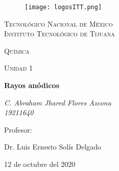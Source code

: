 \documentclass[letterpaper, 12pt]{article}
\begin{document}
\begin{titlepage}
    \begin{figure}[ht]
        \centering
        \texttt{[image: logosITT.png]}
    \end{figure}
    \centering
    {\scshape\LARGE Tecnológico Nacional de México\\Instituto Tecnológico de Tijuana\par}
    \vspace{1cm}
    {\scshape\Large Química\par}
    \vspace{1cm}
    {\scshape\Large Unidad 1\par}
    \vspace{1.5cm}
    {\huge\bfseries Rayos anódicos\par}
    \vspace{2cm}
    {\Large\itshape C. Abraham Jhared Flores Azcona\\19211640\par}
    \vfill
    Profesor: \par
    Dr. Luis Ernesto Solís Delgado
    
    \vfill

    {\large 12 de octubre del 2020}
\end{titlepage}
\end{document}
